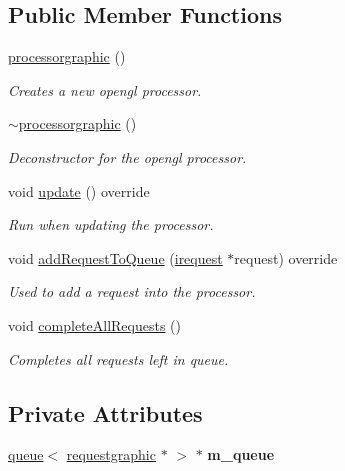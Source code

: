 \subsection*{Public Member Functions}
\begin{DoxyCompactItemize}
\item 
\hyperlink{classflounder_1_1processorgraphic_a2f29e90d39bd5bca3929f61779027c11}{processorgraphic} ()
\begin{DoxyCompactList}\small\item\em Creates a new opengl processor. \end{DoxyCompactList}\item 
\hyperlink{classflounder_1_1processorgraphic_a2d5f45c47b356c688adebc93e38b5af8}{$\sim$processorgraphic} ()
\begin{DoxyCompactList}\small\item\em Deconstructor for the opengl processor. \end{DoxyCompactList}\item 
void \hyperlink{classflounder_1_1processorgraphic_a09711d00647681305dfd8067310ec257}{update} () override
\begin{DoxyCompactList}\small\item\em Run when updating the processor. \end{DoxyCompactList}\item 
void \hyperlink{classflounder_1_1processorgraphic_a28c8b84c3f8066ff9b3cf01a18e8c18a}{add\+Request\+To\+Queue} (\hyperlink{classflounder_1_1irequest}{irequest} $\ast$request) override
\begin{DoxyCompactList}\small\item\em Used to add a request into the processor. \end{DoxyCompactList}\item 
void \hyperlink{classflounder_1_1processorgraphic_a359c0516c7ff2730cf287452b4080fbb}{complete\+All\+Requests} ()
\begin{DoxyCompactList}\small\item\em Completes all requests left in queue. \end{DoxyCompactList}\end{DoxyCompactItemize}
\subsection*{Private Attributes}
\begin{DoxyCompactItemize}
\item 
\mbox{\label{classflounder_1_1processorgraphic_a0bb74bd13c7ab32e1bf82a31283efe9c}} 
\hyperlink{classflounder_1_1queue}{queue}$<$ \hyperlink{classflounder_1_1requestgraphic}{requestgraphic} $\ast$ $>$ $\ast$ {\bfseries m\+\_\+queue}
\end{DoxyCompactItemize}
